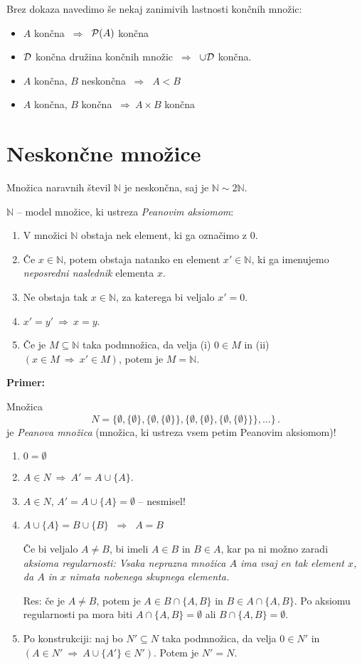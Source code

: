 \documentclass[11pt,paper=b5,footinclude,headinclude]{scrbook} %
\def\sledi {{~\Rightarrow~}}
\begin{document}
Brez dokaza navedimo še nekaj zanimivih lastnosti končnih množic:
\begin{itemize}
  \item $A$ končna $\sledi$ ${\cal P}(A)$ končna
  \item ${\cal D}$ končna družina končnih množic $\sledi$ $\cup {\cal D}$ končna.
  \item $A$ končna, $B$ neskončna $\sledi$ $A<B$
  \item $A$ končna, $B$ končna $\sledi A\times B$ končna
\end{itemize}

\section{Neskončne množice}

Množica naravnih števil $\mathbb{N}$ je neskončna, saj je $\mathbb{N}\sim 2\mathbb{N}$.

$\mathbb{N}$  -- model množice, ki ustreza {\em Peanovim aksiomom}:
\begin{enumerate}[1.)]
  \item V množici $\mathbb{N}$ obstaja nek element, ki ga označimo z 0.
  \item Če $x\in \mathbb{N}$, potem obstaja natanko en element $x'\in \mathbb{N}$, ki ga imenujemo {\em neposredni naslednik} elementa $x$.
  \item Ne obstaja tak $x\in \mathbb{N}$, za katerega bi veljalo $x' = 0$.
  \item $x' = y' \sledi x = y$.
  \item Če je $M\subseteq \mathbb{N}$ taka podmnožica, da velja (i) $0\in M$ in (ii) $(x\in M\sledi x'\in M)$, potem je $M = \mathbb{N}$.
\end{enumerate}

\textbf{Primer:}

Množica
$$N = \{\emptyset, \{\emptyset\}, \{\emptyset, \{\emptyset\}\},
\{\emptyset, \{\emptyset\}, \{\emptyset, \{\emptyset\}\}\},\ldots \}\,.$$
je {\em Peanova množica} (množica, ki ustreza vsem petim Peanovim aksiomom)!

\begin{enumerate}
  \item $0 = \emptyset$
  \item $A\in N\sledi A' = A\cup \{A\}$.
  \item $A\in N$, $A' = A\cup \{A\}= \emptyset$ -- nesmisel!
  \item $A\cup \{A\} = B\cup \{B\}$ $\sledi$ $A = B$

  Če bi veljalo $A\neq B$, bi imeli $A\in B$ in $B\in A$, kar pa ni možno zaradi {\em aksioma regularnosti: Vsaka neprazna množica $A$ ima vsaj en tak element $x$, da $A$ in $x$ nimata nobenega skupnega elementa.}

  Res: če je $A\neq B$, potem je $A\in B\cap \{A,B\}$ in $B\in A\cap \{A,B\}$.
  Po aksiomu regularnosti pa mora biti
  $A\cap \{A,B\}= \emptyset$ ali  $B\cap \{A,B\}= \emptyset$.

  \item Po konstrukciji: naj bo $N'\subseteq N$ taka podmnožica, da velja
  $0\in N'$ in $(A\in N'\sledi A\cup \{A'\}\in N')$. Potem je  $N' = N$.
\end{enumerate}
\end{document}
